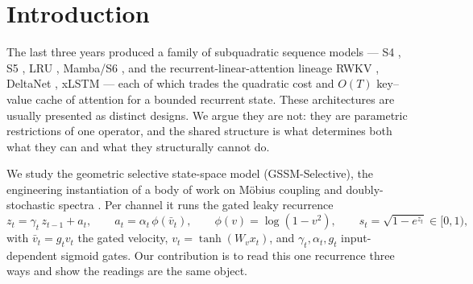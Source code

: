 \documentclass[11pt]{article}
\theoremstyle{definition}
\newcommand{\vbar}{\bar{v}}
\begin{document}
\section{Introduction}

The last three years produced a family of subquadratic sequence models --- S4
\cite{gu2022s4}, S5 \cite{smith2023s5}, LRU \cite{orvieto2023lru}, Mamba/S6
\cite{gu2023mamba}, and the recurrent-linear-attention lineage RWKV \cite{peng2023rwkv},
DeltaNet \cite{yang2024deltanet}, xLSTM \cite{beck2024xlstm} --- each of which trades the
quadratic cost and $O(T)$ key--value cache of attention \cite{vaswani2017attention} for a
bounded recurrent state. These architectures are usually presented as distinct designs. We
argue they are not: they are parametric restrictions of one operator, and the shared
structure is what determines both what they can and what they structurally cannot do.

We study the geometric selective state-space model (GSSM-Selective), the engineering
instantiation of a body of work on M\"obius coupling and doubly-stochastic spectra
\cite{foss2026markov,foss2026ginibre,foss2026gssm}. Per channel it runs the gated leaky
recurrence
\begin{equation}
z_t = \gamma_t\,z_{t-1} + a_t,\qquad
a_t = \alpha_t\,\phi(\vbar_t),\qquad
\phi(v)=\log(1-v^2),\qquad
s_t = \sqrt{1-e^{z_t}}\in[0,1),
\label{eq:core}
\end{equation}
with $\vbar_t = g_t v_t$ the gated velocity, $v_t=\tanh(W_v x_t)$, and
$\gamma_t,\alpha_t,g_t$ input-dependent sigmoid gates. Our contribution is to read this one
recurrence three ways and show the readings are the same object.
\end{document}

